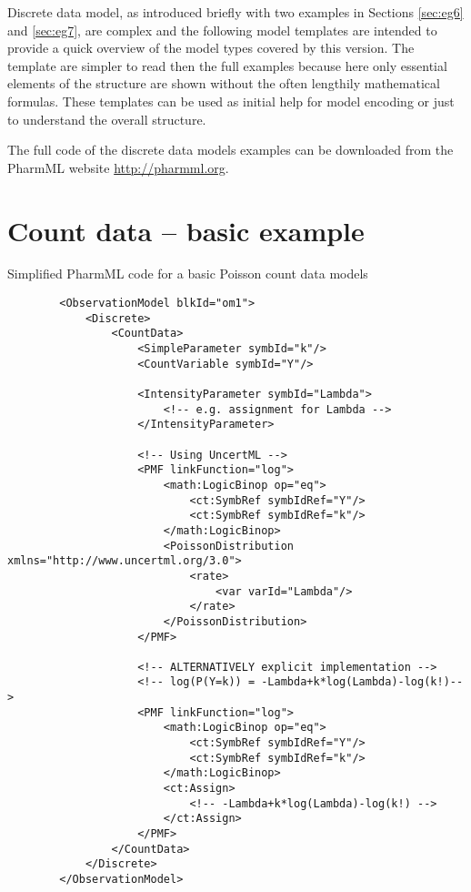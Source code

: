 Discrete data model, as introduced briefly with two examples in Sections \ref{sec:eg6} and 
\ref{sec:eg7}, are complex and the following model templates are intended 
to provide a quick overview of the model types covered by this 
\pharmml version. The template are simpler to read then the full examples because 
here only essential elements of the structure are shown without the often lengthily 
mathematical formulas. These templates can be used as initial help for model encoding
or just to understand the overall structure. 

The full code of the discrete data models examples can be downloaded from the PharmML
website \url{http://pharmml.org}.

\section{Count data -- basic example}
Simplified PharmML code for a basic Poisson count data models
\lstset{language=XML}
\begin{lstlisting}
        <ObservationModel blkId="om1">
            <Discrete>
                <CountData>
                    <SimpleParameter symbId="k"/>
                    <CountVariable symbId="Y"/>

                    <IntensityParameter symbId="Lambda">
                        <!-- e.g. assignment for Lambda -->
                    </IntensityParameter>
                    
                    <!-- Using UncertML -->
                    <PMF linkFunction="log">
                        <math:LogicBinop op="eq">
                            <ct:SymbRef symbIdRef="Y"/>
                            <ct:SymbRef symbIdRef="k"/>
                        </math:LogicBinop>
                        <PoissonDistribution xmlns="http://www.uncertml.org/3.0">
                            <rate>
                                <var varId="Lambda"/>
                            </rate>
                        </PoissonDistribution>
                    </PMF>
                    
                    <!-- ALTERNATIVELY explicit implementation -->
                    <!-- log(P(Y=k)) = -Lambda+k*log(Lambda)-log(k!)-->
                    <PMF linkFunction="log">
                        <math:LogicBinop op="eq">
                            <ct:SymbRef symbIdRef="Y"/>
                            <ct:SymbRef symbIdRef="k"/>
                        </math:LogicBinop>
                        <ct:Assign>
                            <!-- -Lambda+k*log(Lambda)-log(k!) -->
                        </ct:Assign>
                    </PMF>
                </CountData>
            </Discrete>
        </ObservationModel>
\end{lstlisting}


